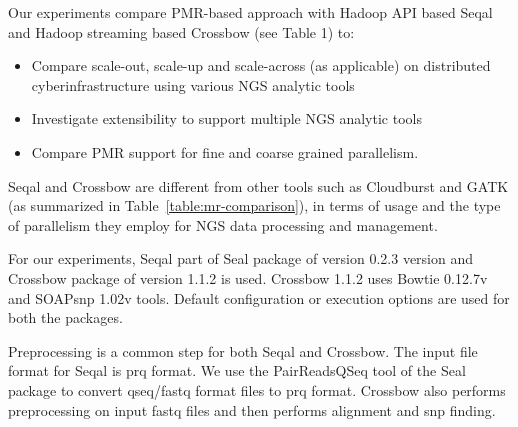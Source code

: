 \documentclass{acm_proc_article-sp}
\begin{document}
Our experiments compare PMR-based approach with Hadoop API based Seqal
and Hadoop streaming based Crossbow 
(see Table 1) to:

\begin{itemize}

\item{Compare scale-out, scale-up and scale-across (as applicable) on
    distributed cyberinfrastructure using various NGS analytic tools}


\item{Investigate extensibility to support multiple NGS analytic
    tools}
\item{Compare PMR support for fine and coarse grained parallelism}.
\end{itemize}

Seqal and Crossbow are different from other tools such as Cloudburst
and GATK (as summarized in Table~\ref{table:mr-comparison}), in terms
of usage and the type of parallelism they employ for NGS data
processing and management.


For our experiments, Seqal part of Seal package
of version 0.2.3 version and Crossbow package of version 1.1.2 is
used. Crossbow 1.1.2 uses Bowtie 0.12.7v and SOAPsnp 1.02v
tools. Default configuration or execution options are used for both
the packages.

Preprocessing is a common step for both Seqal and Crossbow. The input
file format for Seqal is prq format.  We use the PairReadsQSeq tool of
the Seal package to convert qseq/fastq format files to prq
format. Crossbow also performs preprocessing on input fastq files and
then performs alignment and snp finding. 
\end{document}
